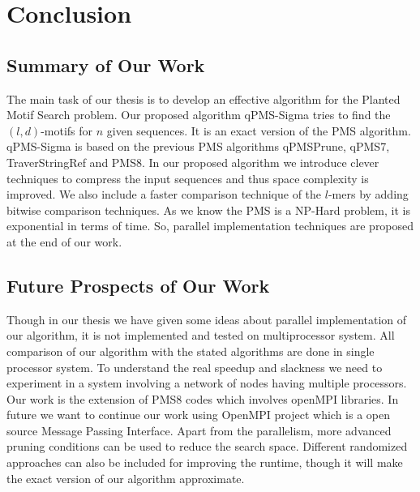 \chapter{Conclusion}\label{conclusion}


\section{Summary of Our Work}
The main task of our thesis is to develop an effective algorithm for the Planted Motif Search problem. Our proposed algorithm qPMS-Sigma tries to find the $ (l, d) $-motifs for $ n $ given sequences. It is an exact version of the PMS algorithm. qPMS-Sigma is based on the previous PMS algorithms qPMSPrune, qPMS7, TraverStringRef and PMS8. In our proposed algorithm we introduce clever techniques to compress the input sequences and thus space complexity is improved. We also include a faster comparison technique of the $ l $-mers by adding bitwise comparison techniques. As we know the PMS is a NP-Hard problem, it is exponential in terms of time. So, parallel implementation techniques are proposed at the end of our work. 


\section{Future Prospects of Our Work}
Though in our thesis we have given some ideas about parallel implementation of our algorithm, it is not implemented and tested on multiprocessor system. All comparison
of our algorithm with the stated algorithms are done in single processor system. To understand the real speedup and slackness we need to experiment in a system involving a network of nodes having multiple processors. Our work is the extension of PMS8 codes which involves openMPI libraries. In future we want to continue our work using OpenMPI project which is a open source Message Passing Interface. Apart from the parallelism, more advanced pruning conditions can be used to reduce the search space. Different randomized approaches can also be included for improving the runtime, though it will make the exact version of our algorithm approximate. 




\endinput
